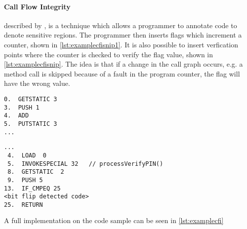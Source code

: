\paragraph{Call Flow Integrity} described by \cite{agl}, is a technique which allows a programmer to annotate code to denote sensitive regions. The programmer then inserts flags which increment a counter, shown in \cref{lst:examplecfisnip1}. It is also possible to insert verfication points where the counter is checked to verify the flag value, shown in \cref{lst:examplecfisnip}. The idea is that if a change in the call graph occurs, e.g. a method call is skipped because of a fault in the program counter, the flag will have the wrong value. 

\begin{lstlisting}[caption={Java code example of the control flow integrity countermeasure incrementing the control flow flag},label={lst:examplecfisnip1}]
0.  GETSTATIC 3
3.  PUSH 1
4.  ADD
5.  PUTSTATIC 3
...
\end{lstlisting}

\begin{lstlisting}[caption={Java code example of the control flow integrity countermeasure checking the control flow flag},label={lst:examplecfisnip}]
...
 4.  LOAD  0
 5.  INVOKESPECIAL 32   // processVerifyPIN()
 8.  GETSTATIC  2
 9.  PUSH 5
13.  IF_CMPEQ 25
<bit flip detected code>
25.  RETURN
\end{lstlisting}

A full implementation on the code sample can be seen in \cref{lst:examplecfi}
